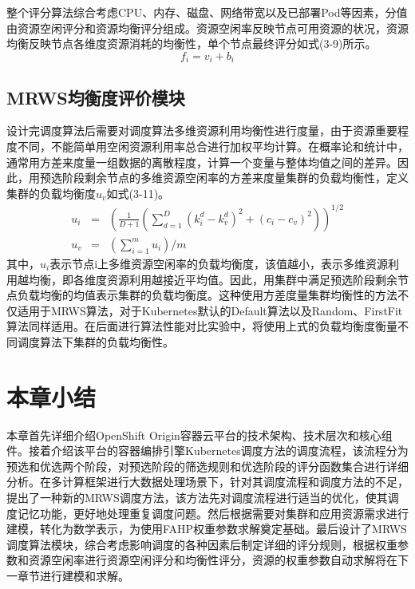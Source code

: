 整个评分算法综合考虑CPU、内存、磁盘、网络带宽以及已部署Pod等因素，分值由资源空闲评分和资源均衡评分组成。资源空闲率反映节点可用资源的状况，资源均衡反映节点各维度资源消耗的均衡性，单个节点最终评分如式(3-9)所示。
\begin{equation}
f_{i} = v_{i}+b_{i}
\end{equation}

\subsection{MRWS均衡度评价模块}
设计完调度算法后需要对调度算法多维资源利用均衡性进行度量，由于资源重要程度不同，不能简单用空闲资源利用率总合进行加权平均计算。在概率论和统计中，通常用方差来度量一组数据的离散程度，计算一个变量与整体均值之间的差异。因此，用预选阶段剩余节点的多维资源空闲率的方差来度量集群的负载均衡性，定义集群的负载均衡度$u_{v}$如式(3-11)。
\begin{eqnarray}
		u_{i} &=& (\frac{1}{D+1}(\sum_{d=1}^{D}(k_{i}^{d}-k_{v}^{d})^{2}+(c_{i}-c_{v})^{2}))^{1/2} \\
	u_{v} &=& (\sum_{i=1}^{m}u_{i})/m
\end{eqnarray}
其中，\begin{math}u_{i}\end{math}表示节点i上多维资源空闲率的负载均衡度，该值越小，表示多维资源利用越均衡，即各维度资源利用越接近平均值。因此，用集群中满足预选阶段剩余节点负载均衡的均值表示集群的负载均衡度。这种使用方差度量集群均衡性的方法不仅适用于MRWS算法，对于Kubernetes默认的Default算法以及Random、FirstFit算法同样适用。在后面进行算法性能对比实验中，将使用上式的负载均衡度衡量不同调度算法下集群的负载均衡性。

\section{本章小结}
本章首先详细介绍OpenShift Origin容器云平台的技术架构、技术层次和核心组件。接着介绍该平台的容器编排引擎Kubernetes调度方法的调度流程，该流程分为预选和优选两个阶段，对预选阶段的筛选规则和优选阶段的评分函数集合进行详细分析。在多计算框架进行大数据处理场景下，针对其调度流程和调度方法的不足，提出了一种新的MRWS调度方法，该方法先对调度流程进行适当的优化，使其调度记忆功能，更好地处理重复调度问题。然后根据需要对集群和应用资源需求进行建模，转化为数学表示，为使用FAHP权重参数求解奠定基础。最后设计了MRWS调度算法模块，综合考虑影响调度的各种因素后制定详细的评分规则，根据权重参数和资源空闲率进行资源空闲评分和均衡性评分，资源的权重参数自动求解将在下一章节进行建模和求解。




